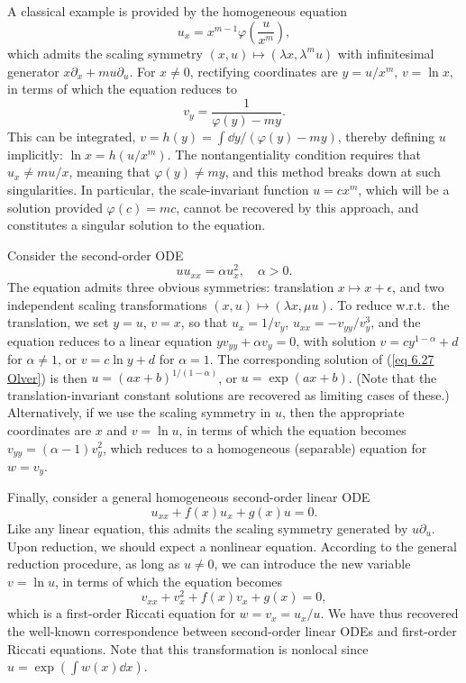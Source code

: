 \begin{example}
    A classical example is provided by the homogeneous equation 
    \[u_x=x^{m-1}\varphi\left(\frac{u}{x^m}\right),\label{eq 6.26 Olver}\]
    which admits the scaling symmetry $(x,u)\mapsto (\lambda x,\lambda^m u)$ with infinitesimal generator $x\partial_x+mu\partial_u$. For $x\neq 0$, rectifying coordinates are $y=u/x^m$, $v=\ln x$, in terms of which the equation reduces to 
    \[v_y=\frac{1}{\varphi(y)-my}.\]
    This can be integrated, $v=h(y)=\int \dd y/(\varphi(y)-my)$, thereby defining $u$ implicitly: $\ln x=h(u/x^m)$. The nontangentiality condition requires that $u_x\neq mu/x$, meaning that $\varphi(y)\neq my$, and this method breaks down at such singularities. In particular, the scale-invariant function $u=cx^m$, which will be a solution provided $\varphi(c)=mc$, cannot be recovered by this approach, and constitutes a singular solution to the equation.
\end{example}

\begin{example}
    Consider the second-order ODE 
    \[uu_{xx}=\alpha u_x^2,\quad \alpha>0.\label{eq 6.27 Olver}\]
    The equation admits three obvious symmetries: translation $x\mapsto x+\epsilon$, and two independent scaling transformations $(x,u)\mapsto (\lambda x,\mu u)$. To reduce w.r.t.\ the translation, we set $y=u$, $v=x$, so that $u_x=1/v_y$, $u_{xx}=-v_{yy}/v_y^3$, and the equation reduces to a linear equation $yv_{yy}+\alpha v_y=0$, with solution $v=c y^{1-\alpha}+d$ for $\alpha\neq 1$, or $v=c\ln y+d$ for $\alpha=1$. The corresponding solution of (\ref{eq 6.27 Olver}) is then $u=(ax+b)^{1/(1-\alpha)}$, or $u=\exp(ax+b)$. (Note that the translation-invariant constant solutions are recovered as limiting cases of these.) Alternatively, if we use the scaling symmetry in $u$, then the appropriate coordinates are $x$ and $v=\ln u$, in terms of which the equation becomes $v_{yy}=(\alpha-1)v_y^2$, which reduces to a homogeneous (separable) equation for $w=v_y$.
\end{example}

\begin{example}
    Finally, consider a general homogeneous second-order linear ODE 
    \[u_{xx}+f(x)u_x+g(x)u=0.\]
    Like any linear equation, this admits the scaling symmetry generated by $u\partial_u$. Upon reduction, we should expect a nonlinear equation. According to the general reduction procedure, as long as $u\neq 0$, we can introduce the new variable $v=\ln u$, in terms of which the equation becomes 
    \[v_{xx}+v_x^2+f(x)v_x+g(x)=0,\]
    which is a first-order Riccati equation  for $w=v_x=u_x/u$. We have thus recovered the well-known correspondence between second-order linear ODEs and first-order Riccati equations. Note that this transformation is nonlocal since $u=\exp \left(\int w(x)\dd x\right)$.
\end{example}

